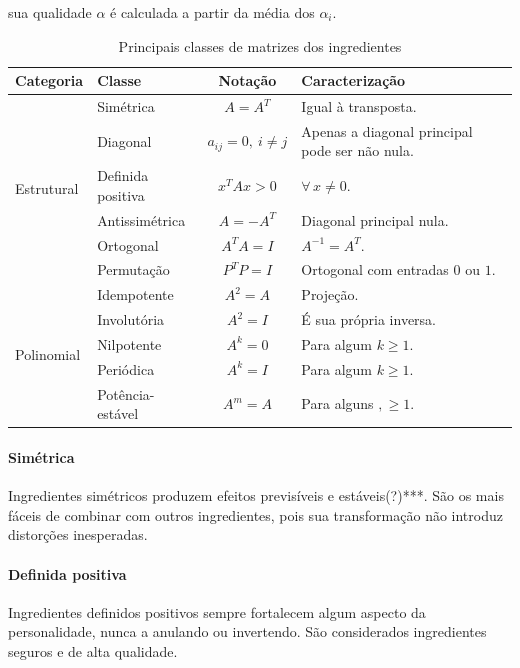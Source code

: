 \documentclass[12pt]{article}
\begin{document}
sua qualidade $\alpha$ é calculada a partir da média dos $\alpha_i$.



\begin{table}[H]
\centering
\caption{Principais classes de matrizes dos ingredientes}
\renewcommand{\arraystretch}{1.3}
\begin{tabular}{|l|l|c|l|}
\hline
\textbf{Categoria} & \textbf{Classe} & \textbf{Notação} & \textbf{Caracterização} \\
\hline
\multirow{6}{*}{Estrutural}
& Simétrica           & $A=A^T$               & Igual à transposta. \\ \cline{2-4}
& Diagonal            & $a_{ij}=0,\ i\neq j$  & Apenas a diagonal principal pode ser não nula. \\ \cline{2-4}
& Definida positiva   & $x^TAx>0$             & $\forall\,x\neq0$. \\ \cline{2-4}
& Antissimétrica      & $A=-A^T$              & Diagonal principal nula. \\ \cline{2-4}
& Ortogonal           & $A^TA=I$              & $A^{-1}=A^T$. \\ \cline{2-4}
& Permutação          & $P^TP=I$              & Ortogonal com entradas $0$ ou $1$. \\
\hline
\multirow{5}{*}{Polinomial}
& Idempotente         & $A^2=A$               & Projeção. \\ \cline{2-4}
& Involutória         & $A^2=I$               & É sua própria inversa. \\ \cline{2-4}
& Nilpotente          & $A^k=0$               & Para algum $k\ge1$. \\ \cline{2-4}
& Periódica           & $A^k=I$               & Para algum $k\ge1$. \\ \cline{2-4}
& Potência-estável    & $A^m=A$             & Para alguns $,\ge1$. \\
\hline
\end{tabular}
\end{table}
\paragraph{Simétrica}
Ingredientes simétricos produzem efeitos previsíveis e estáveis(?)***. São os mais fáceis de combinar com outros ingredientes, pois sua transformação não introduz distorções inesperadas.

\paragraph{Definida positiva}
Ingredientes definidos positivos sempre fortalecem algum aspecto da personalidade, nunca a anulando ou invertendo. São considerados ingredientes seguros e de alta qualidade.
\end{document}

